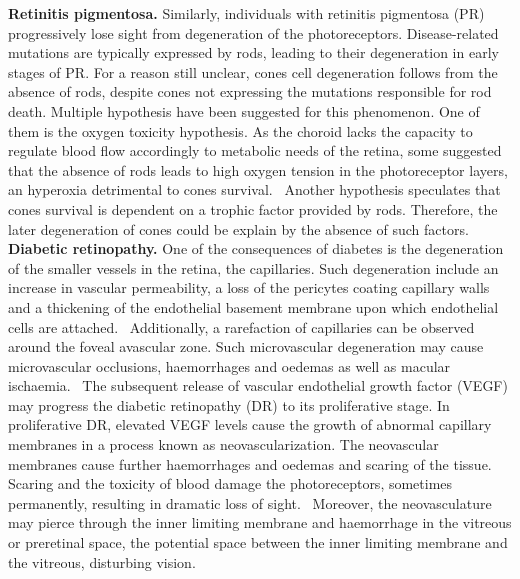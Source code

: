 \documentclass[12pt,a4paper]{journal}
\begin{document}
\textbf{Retinitis pigmentosa.}
Similarly, individuals with retinitis pigmentosa (PR) progressively lose sight from degeneration of the photoreceptors.
Disease-related mutations are typically expressed by rods, leading to their degeneration in early stages of PR.
For a reason still unclear, cones cell degeneration follows from the absence of rods, despite cones not expressing the mutations responsible for rod death.
Multiple hypothesis have been suggested for this phenomenon.
One of them is the oxygen toxicity hypothesis.
As the choroid lacks the capacity to regulate blood flow accordingly to metabolic needs of the retina, some suggested that the absence of rods leads to high oxygen tension in the photoreceptor layers, an hyperoxia detrimental to cones survival.~\cite{Roberts_2018,Stone_1999}
Another hypothesis speculates that cones survival is dependent on a trophic factor provided by rods.
Therefore, the later degeneration of cones could be explain by the absence of such factors.~\cite{Roberts_2022}\\

\textbf{Diabetic retinopathy.}
One of the consequences of diabetes is the degeneration of the smaller vessels in the retina, the capillaries.
Such degeneration include an increase in vascular permeability, a loss of the pericytes coating capillary walls and a thickening of the endothelial basement membrane upon which endothelial cells are attached.~\cite{Medina_2016}
Additionally, a rarefaction of capillaries can be observed around the foveal avascular zone.
Such microvascular degeneration may cause microvascular occlusions, haemorrhages and oedemas as well as macular ischaemia.~\cite{Medina_2016}
The subsequent release of vascular endothelial growth factor (VEGF) may progress the diabetic retinopathy (DR) to its proliferative stage.
In proliferative DR, elevated VEGF levels cause the growth of abnormal capillary membranes in a process known as neovascularization.
The neovascular membranes cause further haemorrhages and oedemas and scaring of the tissue.
Scaring and the toxicity of blood damage the photoreceptors, sometimes permanently, resulting in dramatic loss of sight.~\cite{Friedlander_2007,Gupta_2015}
Moreover, the neovasculature may pierce through the inner limiting membrane and haemorrhage in the vitreous or preretinal space, the potential space between the inner limiting membrane and the vitreous, disturbing vision.\\
\end{document}
